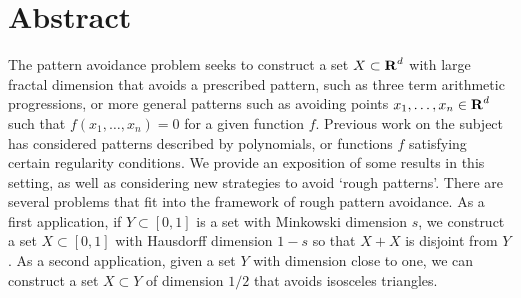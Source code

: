 
\chapter{Abstract}


The pattern avoidance problem seeks to construct a set $X \subset \operatorname{\mathbf{R}}^d$ with large fractal dimension that avoids a prescribed pattern, such as three term arithmetic progressions, or more general patterns such as avoiding points $x_1, \dots, x_n \in \operatorname{\mathbf{R}}^d$ such that $f(x_1, \dots, x_n) = 0$ for a given function $f$. Previous work on the subject has considered patterns described by polynomials, or functions $f$ satisfying certain regularity conditions. We provide an exposition of some results in this setting, as well as considering new strategies to avoid `rough patterns'. There are several problems that fit into the framework of rough pattern avoidance. As a first application, if $Y\subset[0,1]$ is a set with Minkowski dimension $s$, we construct a set $X\subset[0,1]$ with Hausdorff dimension $1-s$ so that $X+X$ is disjoint from $Y$. As a second application, given a set $Y$ with dimension close to one, we can construct a set $X\subset Y$ of dimension $1/2$ that avoids isosceles triangles.